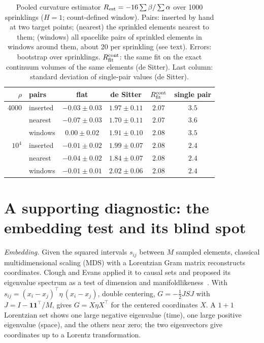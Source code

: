 \documentclass[prd,twocolumn,superscriptaddress,nofootinbib,amsmath,amssymb,floatfix]{revtex4-2}
\begin{document}
\begin{table}[t]
\caption{Pooled curvature estimator $R_{\rm est}=-16\sum\beta/\sum\alpha$ over 1000 sprinklings ($H=1$; count-defined window). Pairs: inserted by hand at two target points; (nearest) the sprinkled elements nearest to them; (windows) all spacelike pairs of sprinkled elements in windows around them, about 20 per sprinkling (see text). Errors: bootstrap over sprinklings. $R_{\rm fit}^{\rm cont}$: the same fit on the exact continuum volumes of the same elements (de Sitter). Last column: standard deviation of single-pair values (de Sitter).}
\label{tab:rest}
\begin{ruledtabular}
\begin{tabular}{rlcccc}
$\rho$ & pairs & flat & de Sitter & $R_{\rm fit}^{\rm cont}$ & single pair\\
\hline
4000 & inserted & $-0.03\pm0.03$ & $1.97\pm0.11$ & $2.07$ & $3.5$\\
 & nearest & $-0.07\pm0.03$ & $1.70\pm0.11$ & $2.07$ & $3.6$\\
 & windows & $0.00\pm0.02$ & $1.91\pm0.10$ & $2.08$ & $3.5$\\
$10^4$ & inserted & $-0.01\pm0.02$ & $1.99\pm0.07$ & $2.08$ & $2.4$\\
 & nearest & $-0.04\pm0.02$ & $1.84\pm0.07$ & $2.08$ & $2.4$\\
 & windows & $-0.01\pm0.01$ & $2.02\pm0.06$ & $2.08$ & $2.4$\\
\end{tabular}
\end{ruledtabular}
\end{table}

\section{A supporting diagnostic: the embedding test and its blind spot}\label{sec:embed}
\emph{Embedding.} Given the squared intervals $s_{ij}$ between $M$ sampled elements, classical multidimensional scaling (MDS) with a Lorentzian Gram matrix reconstructs coordinates. Clough and Evans applied it to causal sets and proposed its eigenvalue spectrum as a test of dimension and manifoldlikeness~\cite{CloughEvans16,Clough17}. With $s_{ij}=(x_i-x_j)^{\top}\eta\,(x_i-x_j)$, double centering, $G=-\tfrac12JSJ$ with $J=I-\mathbf1\mathbf1^{\top}/M$, gives $G=X\eta X^{\top}$ for the centered coordinates $X$. A $1+1$ Lorentzian set shows one large negative eigenvalue (time), one large positive eigenvalue (space), and the others near zero; the two eigenvectors give coordinates up to a Lorentz transformation.
\end{document}
